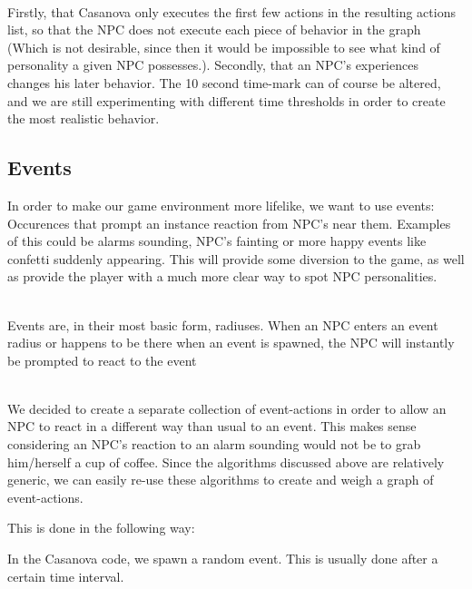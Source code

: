 \documentclass[11pt]{article} %
\begin{document}
~\\
Firstly, that Casanova only executes the first few actions in the resulting actions list, so that the NPC does not execute each piece of behavior in the graph (Which is not desirable, since then it would be impossible to see what kind of personality a given NPC possesses.). 
Secondly, that an NPC's experiences changes his later behavior. %
The 10 second time-mark can of course be altered, and we are still experimenting with different time thresholds in order to create the most realistic behavior.


\newpage
\subsection{Events}
In order to make our game environment more lifelike, we want to use events: Occurences that prompt an instance reaction from NPC's near them. Examples of this could be alarms sounding, NPC's fainting or more happy events like confetti suddenly appearing. This will provide some diversion to the game, as well as provide the player with a much more clear way to spot NPC personalities.

~\\
Events are, in their most basic form, radiuses. When an NPC enters an event radius or happens to be there when an event is spawned, the NPC will instantly be prompted to react to the event

~\\
We decided to create a separate collection of event-actions in order to allow an NPC to react in a different way than usual to an event. This makes sense considering an NPC's reaction to an alarm sounding would not be to grab him/herself a cup of coffee.
Since the algorithms discussed above are relatively generic, we can easily re-use these algorithms to create and weigh a graph of event-actions.  

This is done in the following way:

In the Casanova code, we spawn a random event. This is usually done after a certain time interval. 
\end{document}
